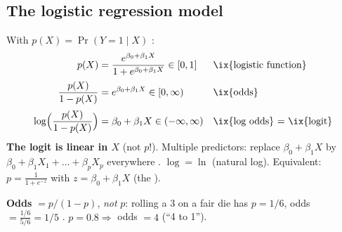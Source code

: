 \subsection{The logistic regression model}

\begin{keybox}
With $p(X)=\Pr(Y=1\mid X)$ :
\begin{align*}
p(X)&=\frac{e^{\beta_0+\beta_1X}}{1+e^{\beta_0+\beta_1X}}\in[0,1] &&\text{\ix{logistic function}}\\[2pt]
\frac{p(X)}{1-p(X)}&=e^{\beta_0+\beta_1X}\in[0,\infty) &&\text{\ix{odds}}\\[2pt]
\log\Bigl(\frac{p(X)}{1-p(X)}\Bigr)&=\beta_0+\beta_1X\in(-\infty,\infty) &&\text{\ix{log odds} $=$ \ix{logit}}
\end{align*}
\textbf{The logit is linear in $X$} (not $p$!). Multiple predictors: replace $\beta_0+\beta_1X$ by
$\beta_0+\beta_1X_1+\dots+\beta_pX_p$ everywhere . $\log=\ln$ (natural log).
Equivalent: $p=\frac{1}{1+e^{-z}}$ with $z=\beta_0+\beta_1X$ (the ).

\textbf{Odds} $=p/(1-p)$, \emph{not} $p$: rolling a 3 on a fair die has $p=1/6$, odds $=\frac{1/6}{5/6}=1/5$
. $p=0.8\Rightarrow$ odds $=4$ (``4 to 1'').
\end{keybox}


